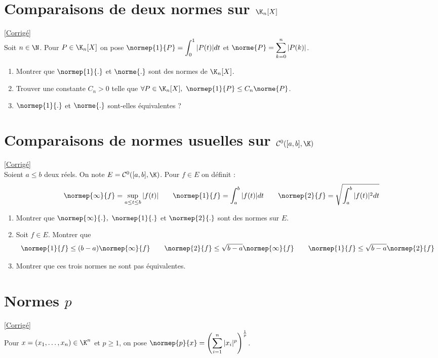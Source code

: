 \documentclass{book}
\begin{document}
	\section{Comparaisons de deux normes sur $\K_n[X]$}
	\textcolor{blue}{\hyperref[sec:comparaison-de-deux-normes-sur-knx]{[Corrigé]}}\\
	\label{Comparaison de deux normes sur KnX}
	Soit $n\in \N$. Pour $P\in \K_n[X]$ on pose $\normep{1}{P}=\displaystyle\int_0^1|P(t)|dt$ et $\norme{P}=\displaystyle\sum_{k=0}^n|P(k)|$.
	\begin{enumerate}
		\item Montrer que $\normep{1}{.}$ et $\norme{.}$ sont des normes de $\K_n[X]$.
		\item Trouver une constante $C_n>0$ telle que $\forall P\in \K_n[X],\ \normep{1}{P}\leq C_n\norme{P}$.
		\item $\normep{1}{.}$ et $\norme{.}$ sont-elles équivalentes ?
	\end{enumerate}
	
	\section{Comparaisons de normes usuelles sur $\mathcal C^0([a,b],\K)$}
	\textcolor{blue}{\hyperref[sec:comparaison-de-normes-usuelles-sur-mathcalc0abk]{[Corrigé]}}\\
	\label{Comparaisons de normes usuelles sur C0}
	Soient $a\leq b$ deux réels. On note $E=\mathcal C^0([a,b],\K)$. Pour $f\in E$ on définit :
	$$\normep{\infty}{f}=\sup\limits_{a\leq t\leq b}|f(t)|\quad\quad \normep{1}{f}=\int_a^b|f(t)|dt\quad\quad \normep{2}{f}=\sqrt{\int_a^b|f(t)|^2dt}$$
	\begin{enumerate}
		\item Montrer que $\normep{\infty}{.},\ \normep{1}{.}$ et $\normep{2}{.}$ sont des normes sur $E$.
		\item Soit $f\in E$. Montrer que
		$$\normep{1}{f}\leq (b-a)\normep{\infty}{f}\quad\quad \normep{2}{f}\leq \sqrt{b-a}\normep{\infty}{f}\quad\quad \normep{1}{f}\leq \sqrt{b-a}\normep{2}{f}$$
		\item Montrer que ces trois normes ne sont pas équivalentes.
	\end{enumerate}
	
	\section{Normes $p$}
	\textcolor{blue}{\hyperref[sec:normes-p]{[Corrigé]}}\\
	\label{Normes p}
	Pour $x=(x_1,\dots,x_n)\in\K^n$ et $p\geq1$, on pose $\displaystyle\normep{p}{x}=\left(\sum_{i=1}^n|x_i|^p\right)^\frac{1}{p}$.
	
\end{document}
